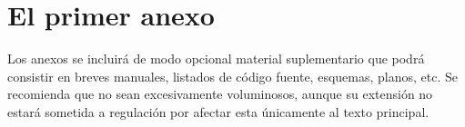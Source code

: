 \chapter{El primer anexo}
\label{cap:AnexoA}

Los anexos se incluirá de modo opcional material suplementario que podrá consistir en breves manuales, listados de código fuente, esquemas, planos, etc. Se recomienda que no sean excesivamente voluminosos, aunque su extensión no estará sometida a regulación por afectar esta únicamente al texto principal. 




